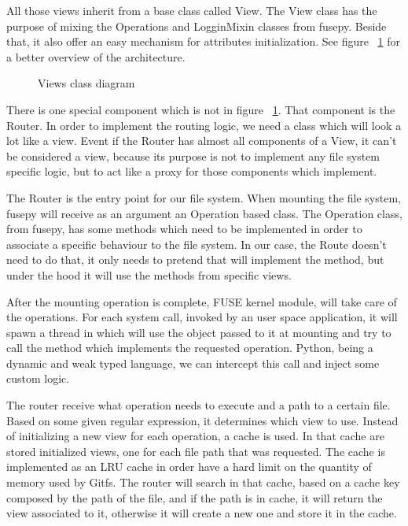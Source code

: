 All those views inherit from a base class called View. The View class has the purpose of mixing the Operations and LogginMixin classes from fusepy. Beside that, it also offer an easy mechanism for attributes initialization. See figure ~\ref{fig:views_diagram} for a better overview of the architecture.

\begin{figure}[h]
  \begin{center}
    \def\svgwidth{\columnwidth}
    
  \end{center}
  \caption{Views class diagram}
  \label{fig:views_diagram}
\end{figure}

There is one special component which is not in figure ~\ref{fig:views_diagram}. That component is the Router. In order to implement the routing logic, we need a class which will look a lot like a view. Event if the Router has almost all components of a View, it can't be considered a view, because its purpose is not to implement any file system specific logic, but to act like a proxy for those components which implement.

The Router is the entry point for our file system. When mounting the file system, fusepy will receive as an argument an Operation based class. The Operation class, from fusepy, has some methods which need to be implemented in order to associate a specific behaviour to the file system. In our case, the Route doesn't need to do that, it only needs to pretend that will implement the method, but under the hood it will use the methods from specific views.

After the mounting operation is complete, FUSE kernel module, will take care of the operations. For each system call, invoked by an user space application, it will spawn a thread in which will use the object passed to it at mounting and try to call the method which implements the requested operation. Python, being a dynamic and weak typed language, we can intercept this call and inject some custom logic.

The router receive what operation needs to execute and a path to a certain file. Based on some given regular expression, it determines which view to use. Instead of initializing a new view for each operation, a cache is used. In that cache are stored initialized views, one for each file path that was requested. The cache is implemented as an LRU cache \cite{lru} in order have a hard limit on the quantity of memory used by Gitfs. The router will search in that cache, based on a cache key composed by the path of the file, and if the path is in cache, it will return the view associated to it, otherwise it will create a new one and store it in the cache.


